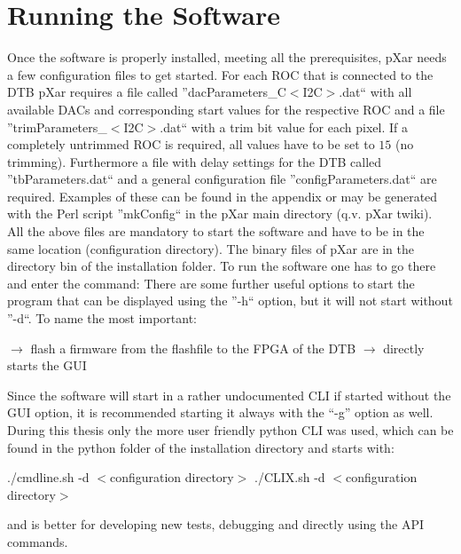 \documentclass[british,11pt,a4paper]{memoir}
\begin{document}
\section{Running the Software}\label{srunpx}
Once the software is properly installed, meeting all the prerequisites, pXar needs a few configuration files to get started. For each \ac{ROC} that is connected to the \ac{DTB} pXar requires a file called ''dacParameters\_C$<$\ac{I2C}$>$.dat`` with all available \ac{DAC}s and corresponding start values for the respective \ac{ROC} and a file ''trimParameters\_$<$\ac{I2C}$>$.dat`` with a trim bit value for each pixel. If a completely untrimmed \ac{ROC} is required, all values have to be set to $15$ (no trimming). Furthermore a file with delay settings for the \ac{DTB} called ''tbParameters.dat`` and a general configuration file ''configParameters.dat`` are required. Examples of these can be found in the appendix  or may be generated with the Perl script ''mkConfig`` in the pXar main directory (q.v. pXar twiki).\\
All the above files are mandatory to start the software and have to be in the same location (configuration directory). The binary files of pXar are in the directory bin of the installation folder. To run the software one has to go there and enter the command:
There are some further useful options to start the program that can be displayed using the ''-h`` option, but it will not start without ''-d``. To name the most important:
\begin{itemize}
	 \ka $\rightarrow$ flash a firmware from the flashfile to the \ac{FPGA} of the \ac{DTB}
	 \ka $\rightarrow$ directly starts the \ac{GUI}
\end{itemize}
Since the software will start in a rather undocumented \ac{CLI} if started without the \ac{GUI} option, it is recommended starting it always with the ``-g'' option as well.\\
During this thesis only the more user friendly python \ac{CLI} was used, which can be found in the python folder of the installation directory and starts with:

\begin{itemize}\ubuntu
	\tri ./cmdline.sh -d $<$configuration directory$>$
	\tri ./CLIX.sh -d $<$configuration directory$>$
\end{itemize}
and is better for developing new tests, debugging and directly using the \ac{API} commands.
\end{document}
